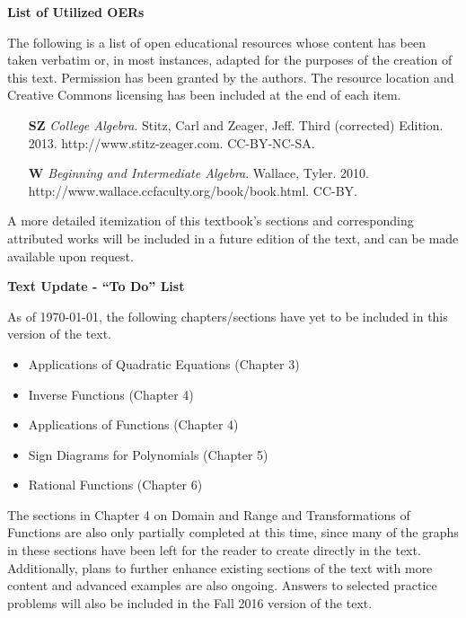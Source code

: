 \begin{center}\textbf{List of Utilized OERs} \end{center}\par The following is a list of open educational resources whose content has been taken verbatim or, in most instances, adapted for the purposes of the creation of this text.  Permission has been granted by the authors.  The resource location and Creative Commons licensing has been included at the end of each item.  %
\begin{itemize}
	\item[{\bf SZ}] \textit{College Algebra}.  Stitz, Carl and Zeager, Jeff.  Third (corrected) Edition.  2013. http://www.stitz-zeager.com.  CC-BY-NC-SA.
	\item[{\bf W}] \textit{Beginning and Intermediate Algebra}.  Wallace, Tyler.  2010.\\
	http://www.wallace.ccfaculty.org/book/book.html. CC-BY.
\end{itemize}
A more detailed itemization of this textbook's sections and corresponding attributed works will be included in a future edition of the text, and can be made available upon request.%

\newpage

\begin{center}\textbf{Text Update - ``To Do'' List} \end{center}\par
As of \today, the following chapters/sections have yet to be included in this version of the text.
\begin{itemize}
		\item Applications of Quadratic Equations (Chapter 3)
		\item Inverse Functions (Chapter 4)
		\item Applications of Functions (Chapter 4)
		\item Sign Diagrams for Polynomials (Chapter 5)
		\item Rational Functions (Chapter 6)
\end{itemize}
The sections in Chapter 4 on Domain and Range and Transformations of Functions are also only partially completed at this time, since many of the graphs in these sections have been left for the reader to create directly in the text.  Additionally, plans to further enhance existing sections of the text with more content and advanced examples are also ongoing.  Answers to selected practice problems will also be included in the Fall 2016 version of the text.